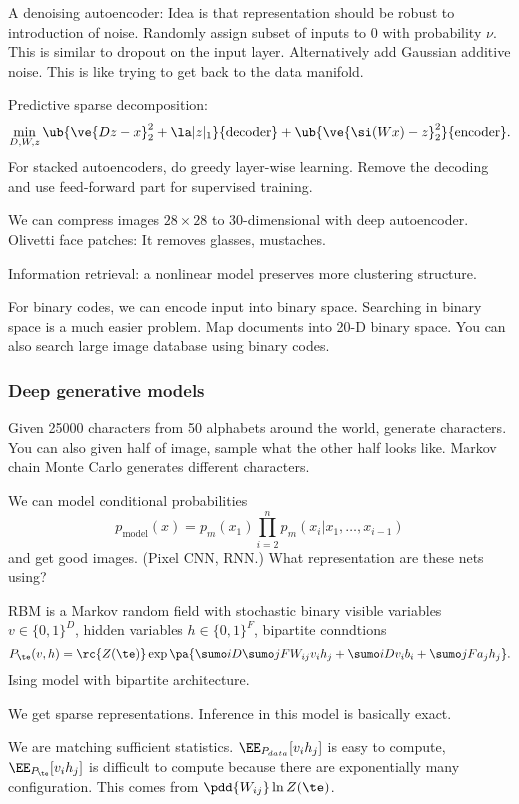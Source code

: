 A denoising autoencoder: Idea is that representation should be robust to introduction of noise. Randomly assign subset of inputs to 0 with probability $\nu$. This is similar to dropout on the input layer. Alternatively add Gaussian additive noise. This is like trying to get back to the data manifold.

Predictive sparse decomposition:
$$
\min_{D,W,z} \ub{\ve{Dz-x}_2^2 + \la |z|_1}{\text{decoder}} + \ub{\ve{\si(Wx) - z}_2^2}{\text{encoder}}.
$$
For stacked autoencoders, do greedy layer-wise learning. Remove the decoding and use feed-forward part for supervised training.

We can compress images $28\times 28$ to 30-dimensional with deep autoencoder. Olivetti face patches: It removes glasses, mustaches.

Information retrieval: a nonlinear model preserves more clustering structure.

For binary codes, we can encode input into binary space. Searching in binary space is a much easier problem. Map documents into 20-D binary space.  You can also search large image database using binary codes.

\subsubsection{Deep generative models}

Given 25000 characters from 50 alphabets around the world, generate characters. You can also given half of image, sample what the other half looks like. 
Markov chain Monte Carlo generates different characters.


We can model conditional probabilities
$$
p_{\text{model}}(x) = p_m(x_1) \prod_{i=2}^n p_m(x_i|x_1,\ldots, x_{i-1})
$$
and get good images. (Pixel CNN, RNN.) What representation are these nets using? 



RBM is a Markov random field with stochastic binary visible variables $v\in \{0,1\}^D$, hidden variables $h\in \{0,1\}^F$, bipartite conndtions
$$
P_\te(v,h) = \rc{Z(\te)} \exp\pa{\sumo iD\sumo jF W_{ij} v_i h_j + \sumo iD v_ib_i + \sumo jF a_jh_j}.
$$
Ising model with bipartite architecture.

We get sparse representations.  Inference in this model is basically exact.

We are matching sufficient statistics. $\EE_{P_{data}}[v_ih_j]$ is easy to compute, $\EE_{P_{\te}} [v_ih_j]$ is difficult to compute because there are exponentially many configuration. This comes from $\pdd{W_{ij}} \ln Z(\te)$.

